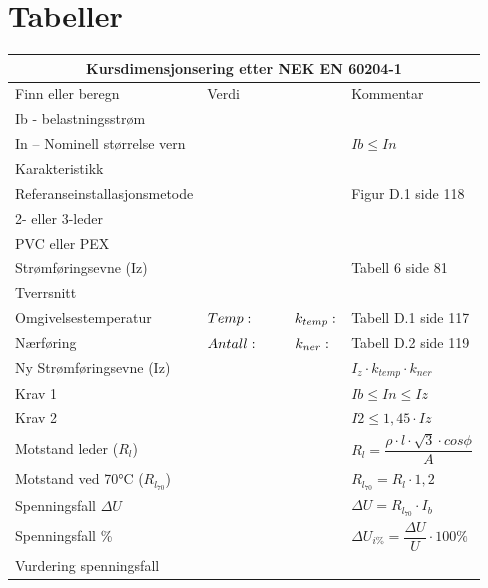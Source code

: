 
\section{Tabeller}

\begin{center}
	\begin{tabular}{| m{4cm} |m{4cm} |m{4cm} |} 
\hline
	\multicolumn{3}{|c|}{\textbf{\cellcolor[HTML]{D5D5D5}Kursdimensjonsering etter NEK EN 60204-1}} \\
\hline
\hline
\rowcolor [HTML]{D5D5D5}
Finn eller beregn 		&Verdi				&Kommentar							\\ \cline{1-3}
Ib - belastningsstrøm		&				&								\\ \cline{1-3}
In – Nominell størrelse vern	&				&$Ib \leq In$							\\ \cline{1-3}
Karakteristikk			&				&								\\ \cline{1-3}
Referanseinstallasjonsmetode	&				&Figur D.1 side 118						\\ \cline{1-3}
2- eller 3-leder		&				&								\\ \cline{1-3}
PVC eller PEX			&				&								\\ \cline{1-3}
Strømføringsevne (Iz) 		&				&Tabell 6 side 81						\\ \cline{1-3}
Tverrsnitt			&				&								\\ \cline{1-3}
Omgivelsestemperatur		&$Temp:\hskip 1cm k_{temp}:$	&Tabell D.1 side 117						\\ \cline{1-3}
Nærføring			&$Antall:\hskip 0.9cm k_{ner}:$		&Tabell D.2 side 119					\\ \cline{1-3}
Ny Strømføringsevne (Iz)	& 				&$I_z\cdot k_{temp} \cdot k_{ner}$ 				\\ \cline{1-3}
Krav 1				&				&$Ib \leq In \leq Iz$						\\ \cline{1-3}
Krav 2				&				&$I2 \leq 1,45 \cdot Iz$					\\ \cline{1-3}
Motstand leder ($R_l$) 		&				&$R_l= \dfrac {\rho \cdot l \cdot \sqrt{3} \cdot cos\phi}{A}$ 	\\ \cline{1-3}
Motstand ved 70°C ($R_{l_{70}}$)	&				&$R_{l_{70}}=R_l \cdot 1,2$				\\ \cline{1-3}
Spenningsfall $\Delta U$	&				&$\Delta U=R_{l_{70}} \cdot I_b$				\\ \cline{1-3}
Spenningsfall \%  		&				&$\Delta U_{i \%}= \dfrac{ \Delta U}{U} \cdot 100\%$		\\ \cline{1-3}
Vurdering spenningsfall 	&				&								\\ \cline{1-3}

\end{tabular}
\end{center}
